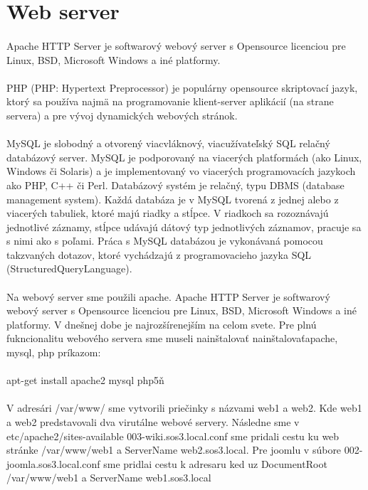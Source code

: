 \section{Web server}
\paragraph{}
Apache HTTP Server je softwarový webový server s Opensource licenciou pre Linux, BSD, Microsoft Windows a iné platformy.
\paragraph{}
PHP (PHP: Hypertext Preprocessor) je populárny opensource skriptovací jazyk, ktorý sa používa najmä na programovanie klient-server aplikácií (na strane servera) a pre vývoj dynamických webových stránok.
\paragraph{}
MySQL je slobodný a otvorený viacvláknový, viacužívateľský SQL relačný databázový server. MySQL je podporovaný na viacerých platformách (ako Linux, Windows či Solaris) a je implementovaný vo viacerých programovacích jazykoch ako PHP, C++ či Perl. Databázový systém je relačný, typu DBMS (database management system). Každá databáza je v MySQL tvorená z jednej alebo z viacerých tabuliek, ktoré majú riadky a stĺpce. V riadkoch sa rozoznávajú jednotlivé záznamy, stĺpce udávajú dátový typ jednotlivých záznamov, pracuje sa s nimi ako s poľami. Práca s MySQL databázou je vykonávaná pomocou takzvaných dotazov, ktoré vychádzajú z programovacieho jazyka SQL (StructuredQueryLanguage).
\paragraph{}
Na webový server sme použili apache. Apache HTTP Server je softwarový webový server s Opensource licenciou pre Linux, BSD, Microsoft Windows a iné platformy. V dnešnej dobe je najrozšírenejším na celom svete. Pre plnú fukncionalitu webového servera sme museli nainštalovať nainštalovaťapache, mysql, php príkazom:\\
\paragraph{}
apt-get install apache2 mysql php5ň\\
\paragraph{}
V adresári /var/www/ sme vytvorili priečinky s názvami web1 a web2. Kde web1 a web2 predstavovali dva virutálne webové servery. Následne sme v etc/apache2/sites-available 003-wiki.sos3.local.conf sme pridali cestu ku web stránke /var/www/web1 a ServerName web2.sos3.local. Pre joomlu v súbore 002-joomla.sos3.local.conf sme pridlai cestu k adresaru ked uz DocumentRoot /var/www/web1 a ServerName web1.sos3.local
